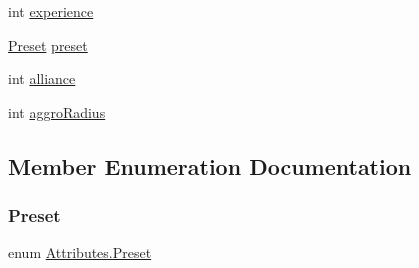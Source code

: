 \begin{DoxyCompactItemize}
\item 
int \mbox{\hyperlink{class_attributes_a43e363930def648b36c6e420290f215c}{experience}}
\item 
\mbox{\hyperlink{class_attributes_a2dcc4757e5dd7b7d518f43f4f194d175}{Preset}} \mbox{\hyperlink{class_attributes_ad6b0d037f9b58413a7cb7be3065cf743}{preset}}
\item 
int \mbox{\hyperlink{class_attributes_a8b2810971ac5f6ab1ec3c0b00498ee5b}{alliance}}
\item 
int \mbox{\hyperlink{class_attributes_aeb2c4d8fb766486fb2302a8e196594a3}{aggro\+Radius}}
\end{DoxyCompactItemize}


\subsection{Member Enumeration Documentation}
\mbox{\label{class_attributes_a2dcc4757e5dd7b7d518f43f4f194d175}} 
\subsubsection{\texorpdfstring{Preset}{Preset}}
{\footnotesize\ttfamily enum \mbox{\hyperlink{class_attributes_a2dcc4757e5dd7b7d518f43f4f194d175}{Attributes.\+Preset}}\hspace{0.3cm}{\ttfamily [strong]}}

